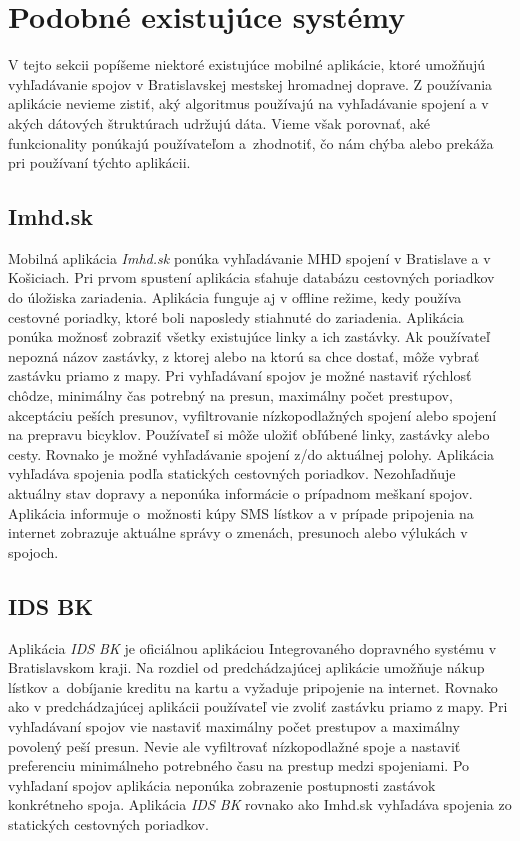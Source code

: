\section{Podobné existujúce systémy}
\label{sec:applications}
V tejto sekcii popíšeme niektoré existujúce mobilné aplikácie, ktoré umožňujú vyhľadávanie spojov v Bratislavskej mestskej hromadnej doprave. Z používania aplikácie nevieme zistiť, aký algoritmus používajú na vyhľadávanie spojení a v akých dátových štruktúrach udržujú dáta. Vieme však porovnať, aké funkcionality ponúkajú používateľom a~zhodnotiť, čo nám chýba alebo prekáža pri používaní týchto aplikácii.

\subsection{Imhd.sk}
Mobilná aplikácia \textit{Imhd.sk} ponúka vyhľadávanie MHD spojení v Bratislave a v Košiciach. Pri prvom spustení aplikácia sťahuje databázu cestovných poriadkov do úložiska zariadenia. Aplikácia funguje aj v offline režime, kedy používa cestovné poriadky, ktoré boli naposledy stiahnuté do zariadenia. Aplikácia ponúka možnosť zobraziť všetky existujúce linky a ich zastávky. Ak používateľ nepozná názov zastávky, z ktorej alebo na ktorú sa chce dostať, môže vybrať zastávku priamo z mapy. Pri vyhľadávaní spojov je možné nastaviť rýchlosť chôdze, minimálny čas potrebný na presun, maximálny počet prestupov, akceptáciu peších presunov, vyfiltrovanie nízkopodlažných spojení alebo spojení na prepravu bicyklov. Používateľ si môže uložiť obľúbené linky, zastávky alebo cesty. Rovnako je možné vyhľadávanie spojení z/do aktuálnej polohy. Aplikácia vyhľadáva spojenia podľa statických cestovných poriadkov. Nezohľadňuje aktuálny stav dopravy a neponúka informácie o prípadnom meškaní spojov. Aplikácia informuje o~možnosti kúpy SMS lístkov a v prípade pripojenia na internet zobrazuje aktuálne správy o zmenách, presunoch alebo výlukách v spojoch.  

\subsection{IDS BK}
Aplikácia \textit{IDS BK} je oficiálnou aplikáciou Integrovaného dopravného systému v Bratislavskom kraji. Na rozdiel od predchádzajúcej aplikácie umožňuje nákup lístkov a~dobíjanie kreditu na kartu a vyžaduje pripojenie na internet. Rovnako ako v predchádzajúcej aplikácii používateľ vie zvoliť zastávku priamo z mapy. Pri vyhľadávaní spojov vie nastaviť maximálny počet prestupov a maximálny povolený peší presun. Nevie ale vyfiltrovať nízkopodlažné spoje a nastaviť preferenciu minimálneho potrebného času na prestup medzi spojeniami. Po vyhľadaní spojov aplikácia neponúka zobrazenie postupnosti zastávok konkrétneho spoja. Aplikácia \textit{IDS BK} rovnako ako Imhd.sk vyhľadáva spojenia zo statických cestovných poriadkov.  

